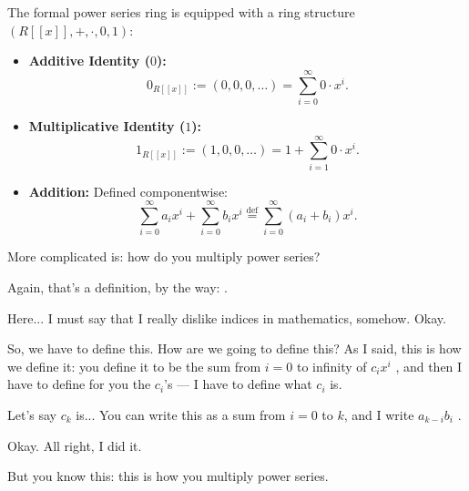 \begin{content}
The formal power series ring is equipped with a ring structure $(R[[x]], +, \cdot, 0, 1)$:
\begin{itemize}
    \item \textbf{Additive Identity ($0$):}
    \begin{equation}\label{eq:power-series-zero}
    0_{R[[x]]} := (0, 0, 0, \dots) = \sum_{i=0}^\infty 0 \cdot x^i.
    \end{equation}
    \item \textbf{Multiplicative Identity ($1$):}
    \begin{equation}\label{eq:power-series-one}
    1_{R[[x]]} := (1, 0, 0, \dots) = 1 + \sum_{i=1}^\infty 0 \cdot x^i.
    \end{equation}
    \item \textbf{Addition:} Defined componentwise:
    \begin{equation}\label{eq:power-series-addition}
    \sum_{i=0}^\infty a_i x^i + \sum_{i=0}^\infty b_i x^i \stackrel{\text{def}}{=} \sum_{i=0}^\infty (a_i + b_i) x^i.
    \end{equation}
\end{itemize}
\end{content}

\begin{speech}[00:29:00 - 00:30:25]
More complicated is: how do you multiply power series?

Again, that's a definition, by the way: .

Here... I must say that I really dislike indices in mathematics, somehow. Okay.

So, we have to define this. How are we going to define this? As I said, this is how we define it: you define it to be the sum from $i = 0$ to infinity of $c_i x^i$ , and then I have to define for you the $c_i$'s --- I have to define what $c_i$ is.

Let's say $c_k$ is... You can write this as a sum from $i = 0$ to $k$, and I write $a_{k-i} b_i$ .

Okay. All right, I did it.

But you know this: this is how you multiply power series.
\end{speech}

